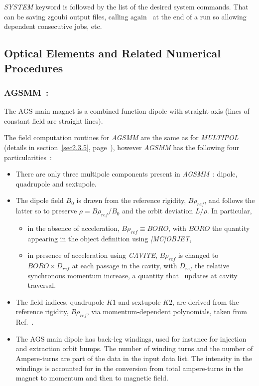 \medskip 

\noindent  \textsl{SYSTEM} keyword is followed by the list of the desired system commands. That 
can be saving zgoubi output files, calling again \zgou\ at the end of a run so allowing 
dependent consecutive jobs, etc. 




\clearemptydoublepage


\subsection{Optical Elements and Related Numerical Procedures} \label{sec4.4}


\subsubsection*{AGSMM~:  \AGSMMTitl} \label{AGSMM}
\medskip 


The AGS main magnet is a combined function dipole with straight axis (lines of constant field are straight lines).  

\noindent The field computation routines for   \textsl{AGSMM}  are the same as for \textsl{MULTIPOL} 
(details in section~\ref{sec2.3.5}, page~\pageref{sec2.3.5}), 
however  \textsl{AGSMM}  has  the following four particularities~: 

\begin{itemize}
  \item There are only three multipole components present in \textsl{AGSMM}~: dipole, quadrupole and sextupole. 
  \item The dipole field $B_0$ is drawn from the reference rigidity, $B\rho_{ref}$, and  follows the latter so to preserve 
$\rho = B\rho_{ref} / B_0$  and the orbit deviation  $L/\rho$. In particular, 
  \begin{itemize}
     \item in the absence of acceleration, $B\rho_{ref} \equiv BORO$, with $BORO$ the quantity appearing  in the object definition 
using  \textsl{[MC]OBJET}, 
     \item in presence of acceleration using \textsl{CAVITE}, $B\rho_{ref} $ is changed 
to $ BORO\times D_{ref}$   at each passage in the cavity, with $D_{ref}$ 
the relative synchronous momentum increase, a quantity that \zgou\ updates at cavity traversal.
  \end{itemize}
  \item The field indices, quadrupole $K1$ and sextupole $K2$, are derived from  the reference rigidity, $B\rho_{ref}$, via 
 momentum-dependent polynomials, taken from Ref.~\cite{EJBleser}.  

  \item The AGS main dipole has back-leg windings, used for instance for injection and extraction orbit bumps. 
The number of winding turns and the  number of Ampere-turns 
are part of the data in the input data list. The intensity in the windings is  accounted for in the conversion 
 from total ampere-turns in the magnet  to momentum and then to magnetic field. 
\end{itemize}

